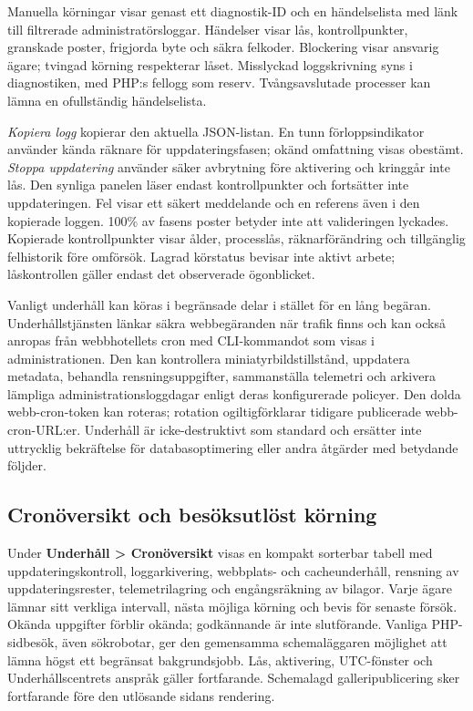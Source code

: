 \documentclass[11pt,a4paper]{article}
\newcommand{\ui}[1]{\textbf{#1}}
\begin{document}
Manuella körningar visar genast ett diagnostik-ID och en händelselista med länk
till filtrerade administratörsloggar. Händelser visar lås, kontrollpunkter,
granskade poster, frigjorda byte och säkra felkoder. Blockering visar ansvarig
ägare; tvingad körning respekterar låset. Misslyckad loggskrivning syns i
diagnostiken, med PHP:s fellogg som reserv. Tvångsavslutade processer kan
lämna en ofullständig händelselista.

\emph{Kopiera logg} kopierar den aktuella JSON-listan. En tunn förloppsindikator
använder kända räknare för uppdateringsfasen; okänd omfattning visas obestämt.
\emph{Stoppa uppdatering} använder säker avbrytning före aktivering och kringgår
inte lås. Den synliga panelen läser endast kontrollpunkter och fortsätter inte
uppdateringen.
Fel visar ett säkert meddelande och en referens även i den kopierade loggen.
100\% av fasens poster betyder inte att valideringen lyckades.
Kopierade kontrollpunkter visar ålder, processlås, räknarförändring och
tillgänglig
felhistorik före omförsök. Lagrad körstatus bevisar inte aktivt arbete;
låskontrollen
gäller endast det observerade ögonblicket.

Vanligt underhåll kan köras i begränsade delar i stället för en lång begäran.
Underhållstjänsten länkar säkra webbegäranden när trafik finns och kan också
anropas från webbhotellets cron med CLI-kommandot som visas i administrationen.
Den kan kontrollera miniatyrbildstillstånd, uppdatera metadata, behandla
rensningsuppgifter, sammanställa telemetri och arkivera lämpliga
administrationsloggdagar enligt deras konfigurerade policyer. Den dolda
webb-cron-token kan roteras; rotation ogiltigförklarar tidigare publicerade
webb-cron-URL:er. Underhåll är icke-destruktivt som standard och ersätter inte
uttrycklig bekräftelse för databasoptimering eller andra åtgärder med betydande
följder.
\subsection{Cronöversikt och besöksutlöst körning}
Under \ui{Underhåll > Cronöversikt} visas en kompakt sorterbar tabell med
uppdateringskontroll, loggarkivering, webbplats- och cacheunderhåll,
rensning av uppdateringsrester, telemetrilagring och engångsräkning av bilagor.
Varje ägare lämnar sitt verkliga intervall, nästa möjliga körning och bevis
för senaste försök. Okända uppgifter förblir okända; godkännande är inte
slutförande. Vanliga PHP-sidbesök, även sökrobotar, ger den gemensamma
schemaläggaren möjlighet att lämna högst ett begränsat bakgrundsjobb.
Lås, aktivering, UTC-fönster och Underhållscentrets anspråk gäller fortfarande.
Schemalagd galleripublicering sker fortfarande före den utlösande sidans
rendering.
\end{document}
